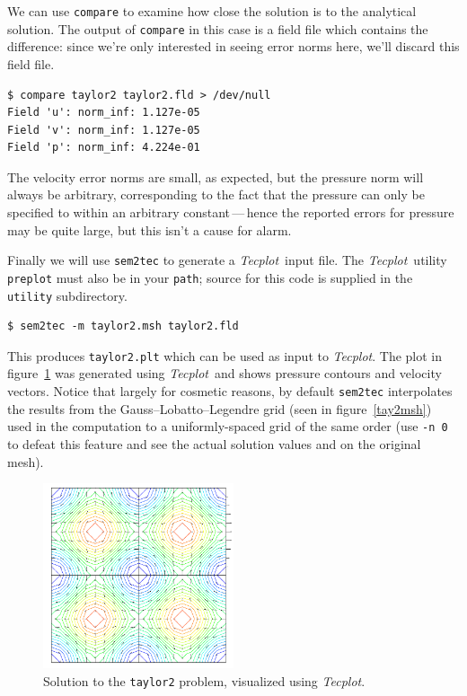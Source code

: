 \documentclass[11pt]{report}
\newcommand{\Tecplot}{\emph{Tecplot}}
\begin{document}
We can use \texttt{compare} to examine how close the solution is to the
analytical solution.  The output of \texttt{compare} in this case
is a field file which contains the difference: since we're only interested
in seeing error norms here, we'll discard this field file.
{\small
\begin{verbatim}
$ compare taylor2 taylor2.fld > /dev/null
Field 'u': norm_inf: 1.127e-05
Field 'v': norm_inf: 1.127e-05
Field 'p': norm_inf: 4.224e-01
\end{verbatim}
}
\noindent
The velocity error norms are small, as expected, but the pressure norm
will always be arbitrary, corresponding to the fact that the pressure
can only be specified to within an arbitrary constant\,---\,hence the
reported errors for pressure may be quite large, but this isn't a
cause for alarm.

Finally we will use \texttt{sem2tec} to generate a \Tecplot\ input
file.  The \Tecplot\ utility \texttt{preplot} must also be in your
\texttt{path}; source for this code is supplied in the \verb|utility|
subdirectory.  {\small
\begin{verbatim}
$ sem2tec -m taylor2.msh taylor2.fld
\end{verbatim}
}
\noindent
This produces \texttt{taylor2.plt} which can be used as input to
\Tecplot.  The plot in figure~\ref{tay2soln} was generated using
\Tecplot\ and shows pressure contours and velocity vectors.  Notice
that largely for cosmetic reasons, by default \texttt{sem2tec}
interpolates the results from the Gauss--Lobatto--Legendre grid (seen
in figure~\ref{tay2msh}) used in the computation to a uniformly-spaced
grid of the same order (use \verb|-n 0| to defeat this feature and
see the actual solution values and on the original mesh).

\begin{figure}
\begin{center}
\includegraphics[width=0.5\textwidth]{taylor2}
\end{center}
\caption{
\label{tay2soln}
  Solution to the \texttt{taylor2} problem, visualized using \Tecplot.
}
\end{figure}
\end{document}
